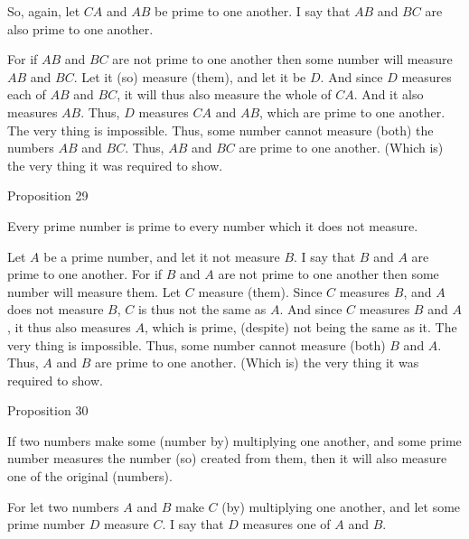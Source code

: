 So, again, let $CA$ and $AB$  be prime to one another. I say that $AB$ and $BC$
are also prime to one another.

For if $AB$ and $BC$ are not prime to one another then some number will measure $AB$ and $BC$. Let it (so) measure (them), and let it be $D$. And since
$D$ measures each of $AB$ and $BC$, it will thus also measure the whole
of $CA$. And it also measures $AB$. Thus, $D$ measures $CA$ and $AB$, which are
prime to one another. The very thing is impossible. Thus, some number
cannot measure (both) the numbers $AB$ and $BC$. Thus, $AB$ and $BC$ are prime
to one another. (Which is) the very thing it was required to show.


\begin{center}
{\large Proposition 29}
\end{center}

Every prime number is prime to every number which
it does not measure.

\epsfysize=0.8in
\centerline{}

Let $A$ be a prime number, and let it not measure $B$. I say that $B$ and
$A$ are prime to one another.
For if $B$ and $A$ are not prime to one another then some number will measure
them. Let $C$ measure (them). Since $C$ measures $B$, and $A$ does not measure
$B$, $C$ is thus not the same as $A$.  And since $C$ measures $B$ and $A$, it thus also
measures $A$, which is prime, (despite) not being the same as it. The very thing is
impossible. Thus, some number cannot measure (both) $B$ and $A$.
Thus, $A$ and $B$ are prime to one another. (Which is) the very thing it
was required to show.


\begin{center}
{\large Proposition 30}
\end{center}

If two numbers make some (number by) multiplying one another, and some prime number measures the number (so) created from them, then it will also measure one of the original (numbers).

\epsfysize=1.6in
\centerline{}

For let two numbers $A$ and $B$ make $C$ (by) multiplying one another, and
let some prime number $D$ measure $C$. I say that $D$ measures one of $A$ and
$B$.

